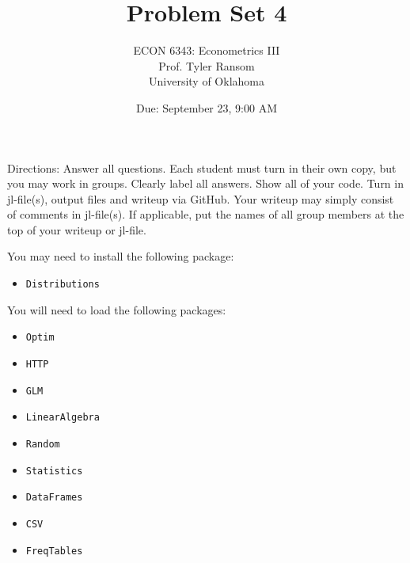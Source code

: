 \documentclass[12pt,english]{article}
\begin{document}
\title{Problem Set 4}
\author{ECON 6343: Econometrics III\\
Prof. Tyler Ransom\\
University of Oklahoma}
\date{Due: September 23, 9:00 AM}

\maketitle
Directions: Answer all questions. Each student must turn in their own copy, but you may work in groups. Clearly label all answers. Show all of your code. Turn in jl-file(s), output files and writeup via GitHub. Your writeup may simply consist of comments in jl-file(s). If applicable, put the names of all group members at the top of your writeup or jl-file.

You may need to install the following package:
\begin{itemize}
    \item[~] \texttt{Distributions}
\end{itemize}

You will need to load the following packages:
\begin{itemize}
    \item[~] \texttt{Optim} 
    \item[~] \texttt{HTTP} 
    \item[~] \texttt{GLM} 
    \item[~] \texttt{LinearAlgebra} 
    \item[~] \texttt{Random} 
    \item[~] \texttt{Statistics} 
    \item[~] \texttt{DataFrames} 
    \item[~] \texttt{CSV} 
    \item[~] \texttt{FreqTables}
\end{itemize}
\end{document}
